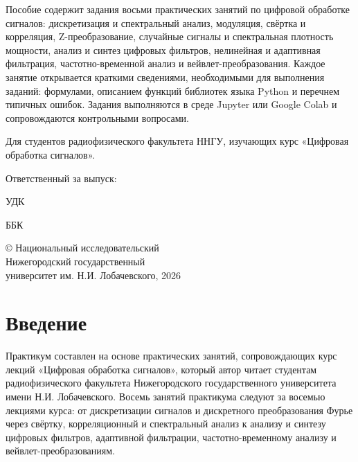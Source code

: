 \documentclass[12pt,a4paper,openany]{book}
\newcommand{\todo}[1]{\fbox{\small #1}}
\begin{document}
Пособие содержит задания восьми практических занятий по цифровой обработке сигналов: дискретизация и спектральный анализ, модуляция, свёртка и корреляция, Z-преобразование, случайные сигналы и спектральная плотность мощности, анализ и синтез цифровых фильтров, нелинейная и адаптивная фильтрация, частотно-временной анализ и вейвлет-преобразования. Каждое занятие открывается краткими сведениями, необходимыми для выполнения заданий: формулами, описанием функций библиотек языка Python и перечнем типичных ошибок. Задания выполняются в среде Jupyter или Google Colab и сопровождаются контрольными вопросами.

Для студентов радиофизического факультета ННГУ, изучающих курс «Цифровая обработка сигналов».

\vspace{28pt}

\begin{center}
    Ответственный за выпуск:\\
    \todo{[должность]} \textbf{\todo{[И.О. Фамилия]}}
\end{center}

\vfill

\begin{flushright}
УДК \todo{[указать]}

ББК \todo{[указать]}

© Национальный исследовательский\\
Нижегородский государственный\\
университет им. Н.И. Лобачевского, 2026
\end{flushright}


\tableofcontents

\newpage

\chapter*{Введение}

Практикум составлен на основе практических занятий, сопровождающих курс лекций «Цифровая обработка сигналов», который автор читает студентам радиофизического факультета Нижегородского государственного университета имени Н.И. Лобачевского. Восемь занятий практикума следуют за восемью лекциями курса: от дискретизации сигналов и дискретного преобразования Фурье через свёртку, корреляционный и спектральный анализ к анализу и синтезу цифровых фильтров, адаптивной фильтрации, частотно-временному анализу и вейвлет-преобразованиям.
\end{document}
